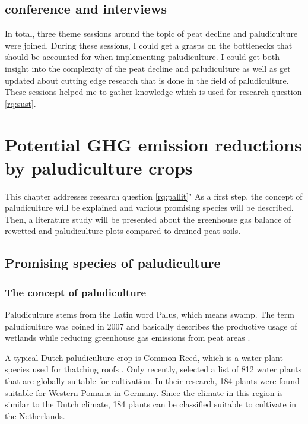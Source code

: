 \documentclass[a4paper,12pt]{scrbook}
\begin{document}
\section{conference and interviews}
In total, three theme sessions around the topic of peat decline and paludiculture were joined. During these sessions, I could get a grasps on the bottlenecks that should be accounted for when implementing paludiculture. I could get both insight into the complexity of the peat decline and paludiculture as well as get updated about cutting edge research that is done in the field of paludiculture. These sessions helped me to gather knowledge which is used for research question \ref{rq:sust}.


\chapter{Potential GHG emission reductions by paludiculture crops} \label{ch:litpalghg}

This chapter addresses research question \ref{rq:pallit}" As a first step, the concept of paludiculture will be explained and various promising species will be described. Then, a literature study will be presented about the greenhouse gas balance of rewetted and paludiculture plots compared to drained peat soils.

\section{Promising species of paludiculture}

\subsection{The concept of paludiculture}
Paludiculture stems from the Latin word Palus, which means swamp. The term paludiculture was coined in 2007 and basically describes the productive usage of wetlands while reducing greenhouse gas emissions from peat areas \citep{wichtmann2007paludiculture}. 

A typical Dutch paludiculture crop is Common Reed, which is a water plant species used for thatching roofs \citep{wichtmann2016paludiculture}. Only recently, \citet{abel2013database} selected a list of 812 water plants that are globally suitable for cultivation. In their research, 184 plants were found suitable for Western Pomaria in Germany. Since the climate in this region is similar to the Dutch climate, 184 plants can be classified suitable to cultivate in the Netherlands. 
\end{document}
